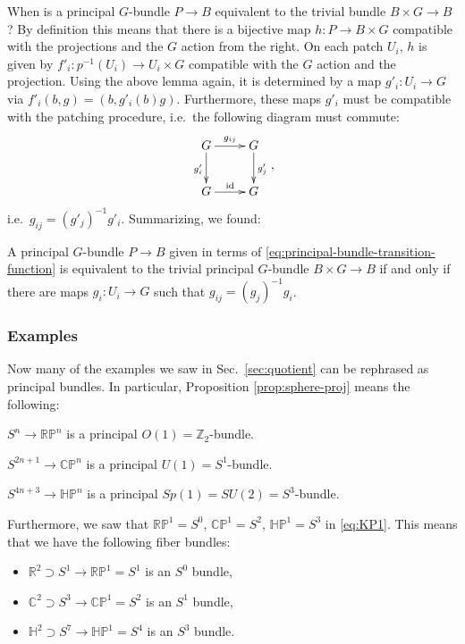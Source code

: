 \documentclass[12pt]{article}
\numberwithin{equation}{section}
\numberwithin{figure}{section}
\theoremstyle{remark}
\def\bC{\mathbb{C}}
\def\bH{\mathbb{H}}
\def\bR{\mathbb{R}}
\def\bZ{\mathbb{Z}}
\def\RP{\mathbb{RP}}
\def\CP{\mathbb{CP}}
\def\HP{\mathbb{HP}}
\begin{document}
When is a principal $G$-bundle $P\to B$ equivalent to the trivial bundle $B\times G \to B$?
By definition this means that there is a bijective map $h: P\to B\times G$
compatible with the projections and the $G$ action from the right.
On each patch $U_i$, $h$ is given by $f'_i: p^{-1}(U_i)\to U_i\times G$
compatible with the $G$ action and the projection.
Using the above lemma again,
it is determined by a map $g'_i: U_i\to G$ via $f'_i(b,g)=(b,g'_i(b)g)$.
Furthermore, these maps $g'_i$ must be compatible with the patching procedure, i.e.~the following diagram must commute:
\begin{equation}
\vcenter{\xymatrix{
  G \ar[r]^{g_{ij}} \ar[d]_{g'_i} & G \ar[d]^{g'_j} \\
  G \ar[r]^{\text{id}} & G 
}},
\end{equation}
i.e.~$g_{ij} = (g'_j)^{-1} g'_i$.
Summarizing, we found: 
\begin{proposition}
  A principal $G$-bundle $P\to B$
  given in terms of \eqref{eq:principal-bundle-transition-function}
  is equivalent to the trivial principal $G$-bundle $B\times G \to B$
  if and only if there are maps $g_i: U_i\to G$ such that $g_{ij} = (g_j)^{-1} g_i$.
\end{proposition}

\subsubsection{Examples}

Now many of the examples we saw in Sec.~\ref{sec:quotient} can be rephrased as principal bundles.
In particular, Proposition \eqref{prop:sphere-proj} means the following:
\begin{example}
  \label{ex:RPn}
$S^n\to \RP^n$ is a principal $O(1)=\bZ_2$-bundle.
\end{example}

\begin{example}
  \label{ex:CPn}
$S^{2n+1}\to \CP^n$ is a principal $U(1)=S^1$-bundle.
\end{example}

\begin{example}
  \label{ex:HPn}
  $S^{4n+3}\to \HP^n$ is a principal $Sp(1)=SU(2)=S^3$-bundle.
\end{example}

Furthermore, we saw that $\RP^1=S^0$, $\CP^1=S^2$, $\HP^1=S^3$ 
in \eqref{eq:KP1}. 
This means that we have the following fiber bundles:
\begin{itemize}
  \item $\bR^2\supset S^1\to \RP^1=S^1$  is an $S^0$ bundle,
  \item $\bC^2\supset S^3\to \CP^1=S^2$ is an $S^1$ bundle,
  \item $\bH^2\supset S^7\to \HP^1=S^4$ is an $S^3$ bundle.
\end{itemize}
\end{document}

